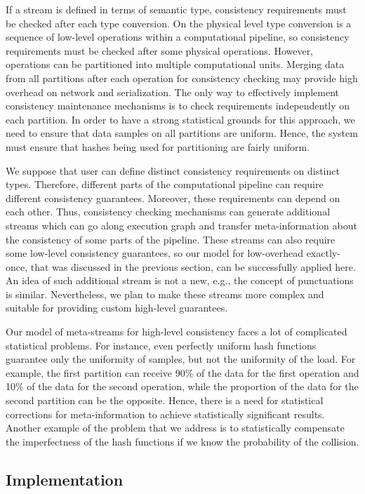 If a stream is defined in terms of semantic type, consistency requirements must be checked after each type conversion. On the physical level type conversion is a sequence of low-level operations within a computational pipeline, so consistency requirements must be checked after some physical operations. However, operations can be partitioned into multiple computational units. Merging data from all partitions after each operation for consistency checking may provide high overhead on network and serialization. The only way to effectively implement consistency maintenance mechanisms is to check requirements independently on each partition. In order to have a strong statistical grounds for this approach, we need to ensure that data samples on all partitions are uniform. Hence, the system must ensure that hashes being used for partitioning are fairly uniform.

We suppose that user can define distinct consistency requirements on distinct types. Therefore, different parts of the computational pipeline can require different consistency guarantees. Moreover, these requirements can depend on each other. Thus, consistency checking mechanisms can generate additional streams which can go along execution graph and transfer meta-information about the consistency of some parts of the pipeline. These streams can also require some low-level consistency guarantees, so our model for low-overhead exactly-once, that was discussed in the previous section, can be successfully applied here. An idea of such additional stream is not a new, e.g., the concept of punctuations~\cite{Tucker:2003:EPS:776752.776780} is similar. Nevertheless, we plan to make these streams more complex and suitable for providing custom high-level guarantees.

Our model of meta-streams for high-level consistency faces a lot of complicated statistical problems. For instance, even perfectly uniform hash functions guarantee only the uniformity of samples, but not the uniformity of the load. For example, the first partition can receive 90\% of the data for the first operation and 10\% of the data for the second operation, while the proportion of the data for the second partition can be the opposite. Hence, there is a need for statistical corrections for meta-information to achieve statistically significant results. Another example of the problem that we address is to statistically compensate the imperfectness of the hash functions if we know the probability of the collision.  

\subsection{Implementation}

